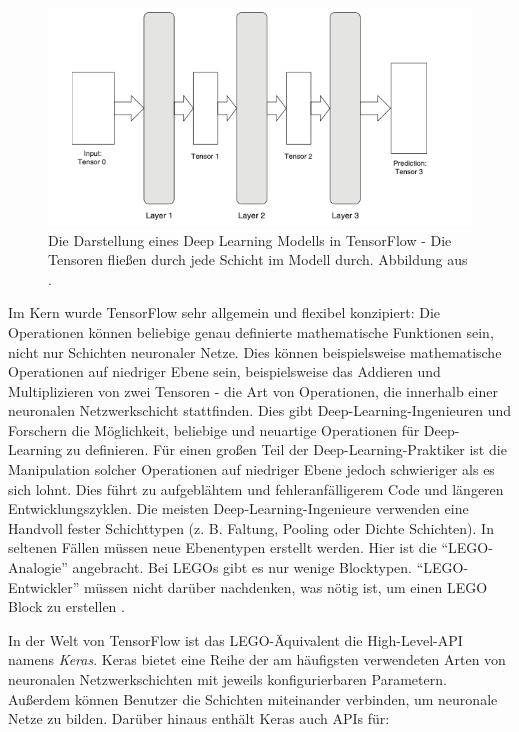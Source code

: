  \begin{figure}[H]
     \centering
     \includegraphics[width=13cm]{kapitel5/tflayers.png}
     \caption[Die Darstellung eines Deep Learning Modells in TensorFlow]{Die Darstellung eines Deep Learning Modells in TensorFlow - Die Tensoren fließen durch jede Schicht im Modell durch. Abbildung aus \cite[28]{cai2020deep}.}
     \label{Kap5:tnflayers}
 \end{figure}


Im Kern wurde TensorFlow sehr allgemein und flexibel konzipiert: Die Operationen können beliebige genau definierte mathematische Funktionen sein, nicht nur Schichten neuronaler Netze. Dies können beispielsweise mathematische Operationen auf niedriger Ebene sein, beispielsweise das Addieren und Multiplizieren von zwei Tensoren - die Art von Operationen, die innerhalb einer neuronalen Netzwerkschicht stattfinden. Dies gibt Deep-Learning-Ingenieuren und Forschern die Möglichkeit, beliebige und neuartige Operationen für Deep-Learning zu definieren. Für einen großen Teil der Deep-Learning-Praktiker ist die Manipulation solcher Operationen auf niedriger Ebene jedoch schwieriger als es sich lohnt. Dies führt zu aufgeblähtem und fehleranfälligerem Code und längeren Entwicklungszyklen. Die meisten Deep-Learning-Ingenieure verwenden eine Handvoll fester Schichttypen (z. B. Faltung, Pooling oder Dichte Schichten). In seltenen Fällen müssen neue Ebenentypen erstellt werden. Hier ist die \enquote{LEGO-Analogie} angebracht. Bei LEGOs gibt es nur wenige Blocktypen. \enquote{LEGO-Entwickler} müssen nicht darüber nachdenken, was nötig ist, um einen LEGO Block zu erstellen \cite[28]{cai2020deep}. 


In der Welt von TensorFlow ist das LEGO-Äquivalent die High-Level-API namens \textit{Keras}. Keras bietet eine Reihe der am häufigsten verwendeten Arten von neuronalen Netzwerkschichten mit jeweils konfigurierbaren Parametern. Außerdem können Benutzer die Schichten miteinander verbinden, um neuronale Netze zu bilden. Darüber hinaus enthält Keras auch APIs für:


